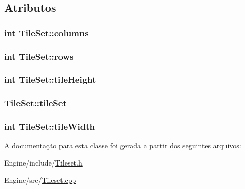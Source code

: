 \subsection{Atributos}
\hypertarget{classTileSet_a47ae11f9d04f9da3fbaba834fdbc62cf}{
\subsubsection[{columns}]{\setlength{\rightskip}{0pt plus 5cm}int Tile\+Set\+::columns\hspace{0.3cm}{\ttfamily [private]}}}\label{classTileSet_a47ae11f9d04f9da3fbaba834fdbc62cf}
\hypertarget{classTileSet_abdfce26ff299e8904107edc22529e28f}{
\subsubsection[{rows}]{\setlength{\rightskip}{0pt plus 5cm}int Tile\+Set\+::rows\hspace{0.3cm}{\ttfamily [private]}}}\label{classTileSet_abdfce26ff299e8904107edc22529e28f}
\hypertarget{classTileSet_a9409211e1c5560f969b737714be977c0}{
\subsubsection[{tile\+Height}]{\setlength{\rightskip}{0pt plus 5cm}int Tile\+Set\+::tile\+Height\hspace{0.3cm}{\ttfamily [private]}}}\label{classTileSet_a9409211e1c5560f969b737714be977c0}
\hypertarget{classTileSet_adbd7ac102ce306e4f367c32cfa576979}{
\subsubsection[{tile\+Set}]{ Tile\+Set\+::tile\+Set\hspace{0.3cm}{\ttfamily [private]}}}\label{classTileSet_adbd7ac102ce306e4f367c32cfa576979}
\hypertarget{classTileSet_a9ba9087a6da877f78af6cdf9afb0af7c}{
\subsubsection[{tile\+Width}]{\setlength{\rightskip}{0pt plus 5cm}int Tile\+Set\+::tile\+Width\hspace{0.3cm}{\ttfamily [private]}}}\label{classTileSet_a9ba9087a6da877f78af6cdf9afb0af7c}


A documentação para esta classe foi gerada a partir dos seguintes arquivos\+:\begin{DoxyCompactItemize}
\item 
Engine/include/\hyperlink{Tileset_8h}{Tileset.\+h}\item 
Engine/src/\hyperlink{Tileset_8cpp}{Tileset.\+cpp}\end{DoxyCompactItemize}
